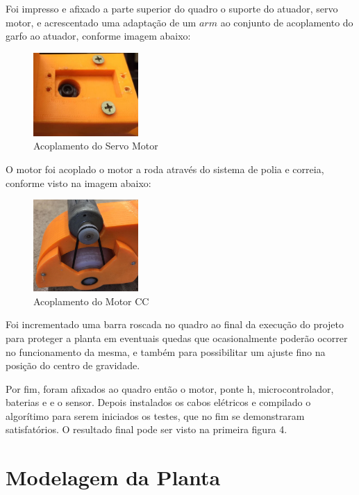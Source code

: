 \documentclass[conference,harvard,brazil,english]{sbatex}
\begin{document}
        Foi impresso e afixado a parte superior do quadro o suporte do atuador, servo motor, e acrescentado uma adaptação de um $arm$  ao conjunto de acoplamento do garfo ao atuador, conforme imagem abaixo:
        
        \begin{figure}[h]
            \centering
            \includegraphics[width=4cm]{imagens/planta/arm.jpg}
            \caption{Acoplamento do Servo Motor}
        \end{figure}
        
        O motor foi acoplado o motor a roda através do sistema de polia e correia, conforme visto na imagem abaixo:
        
        \begin{figure}[h]
            \centering
            \includegraphics[width=4cm]{imagens/planta/PoliaMotinha.jpg}
            \caption{Acoplamento do Motor CC}
        \end{figure}
        
        Foi incrementado uma barra roscada no quadro ao final da execução do projeto para proteger a planta em eventuais quedas que ocasionalmente poderão ocorrer no funcionamento da mesma, e também para possibilitar um ajuste fino na posição do centro de gravidade.
        
        Por fim, foram afixados ao quadro então o motor, ponte h, microcontrolador, baterias e e o sensor. Depois instalados os cabos elétricos e compilado o algorítimo para serem iniciados os testes, que no fim se demonstraram satisfatórios. O resultado final pode ser visto na primeira figura 4.
        
    \section{Modelagem da Planta}
        
\end{document}
